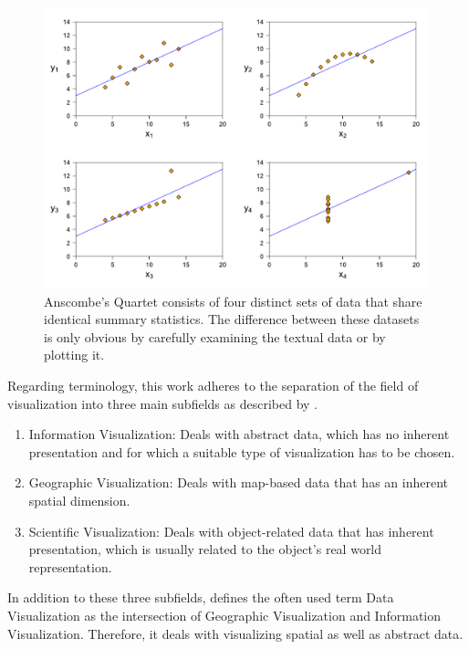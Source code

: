 \begin{figure}[tp]
    \centering
    \includegraphics[keepaspectratio,width=\linewidth,height=\fullh / 3]
    {diagrams/anscombe.pdf}

    \caption[Anscombe's Quartet]{
        Anscombe's Quartet consists of four distinct sets of data that share identical summary statistics. The difference between these datasets is only obvious by carefully examining the textual data or by plotting it. 
    }
    \label{fig:AnscombesQuartet}
\end{figure}

Regarding terminology, this work adheres to the separation of the field of visualization into three main subfields as described by \cite{IVISCourseNotes}.

\begin{enumerate}
    \item Information Visualization: Deals with abstract data, which has no inherent presentation and for which a suitable type of visualization has to be chosen.
    \item Geographic Visualization: Deals with map-based data that has an inherent spatial dimension. 
    \item Scientific Visualization: Deals with object-related data that has inherent presentation, which is usually related to the object's real world representation.
\end{enumerate}

In addition to these three subfields, \cite{IVISCourseNotes} defines the often used term Data Visualization as the intersection of Geographic Visualization and Information Visualization. Therefore, it deals with visualizing spatial as well as abstract data.

